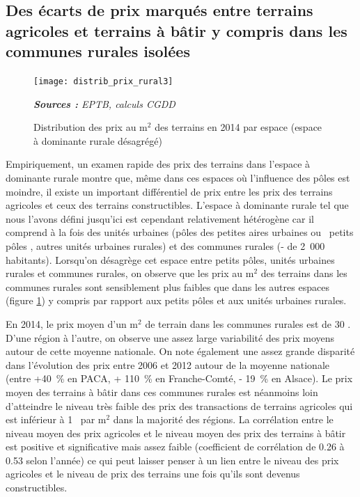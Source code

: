 \documentclass[10.5pt,a4paper]{article}
\def\euro{\mbox{\raisebox{.25ex}{{\it =}}\hspace{-.5em}{\sf C}}}
\begin{document}
{\subsection{Des écarts de prix marqués entre terrains agricoles et terrains à bâtir y compris dans les communes rurales isolées} 

\begin{figure}[!h]%
\begin{center}
\caption{Distribution des prix au m$^2$ des terrains en 2014 par espace (espace à dominante rurale désagrégé)}%
\label{distrib_prix_rural3}%
\texttt{[image: distrib\_prix\_rural3]}%
\end{center}

\scriptsize \textit{\textbf{Sources :} EPTB, calculs CGDD}
\end{figure}

Empiriquement, un examen rapide des prix des terrains dans l'espace à dominante rurale montre que, même dans ces espaces où l'influence des pôles est moindre, il existe un important différentiel de prix entre les prix des terrains agricoles et ceux des terrains constructibles. L'espace à dominante rurale tel que nous l'avons défini jusqu'ici est cependant relativement hétérogène car il comprend à la fois des unités urbaines (pôles des petites aires urbaines ou \og~petits pôles \fg, autres unités urbaines rurales) et des communes rurales (- de 2~000 habitants). Lorsqu'on désagrège cet espace entre petits pôles, unités urbaines rurales et communes rurales, on observe que les prix au m$^2$ des terrains dans les communes rurales sont sensiblement plus faibles que dans les autres espaces (figure \ref{distrib_prix_rural3}) y compris par rapport aux petits pôles et aux unités urbaines rurales.\par 



En 2014, le prix moyen d'un m$^2$ de terrain dans les communes rurales est de 30 \euro. D'une région à l'autre, on observe une assez large variabilité des prix moyens autour de cette moyenne nationale. On note également une assez grande disparité dans l'évolution des prix entre 2006 et 2012 autour de la moyenne nationale (entre +40~\% en PACA, + 110~\% en Franche-Comté, - 19~\% en Alsace). Le prix moyen des terrains à bâtir dans ces communes rurales est néanmoins loin d'atteindre le niveau très faible des prix des transactions de terrains agricoles qui est inférieur à 1 \euro~par m$^2$ dans la majorité des régions. La corrélation entre le niveau moyen des prix agricoles et le niveau moyen des prix des terrains à bâtir est positive et significative mais assez faible (coefficient de corrélation de 0.26 à 0.53 selon l'année) ce qui peut laisser penser à un lien entre le niveau des prix agricoles et le niveau de prix des terrains une fois qu'ils sont devenus constructibles. \par 

}
\end{document}
